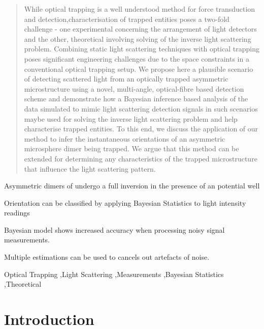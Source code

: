 \documentclass[preprint,3p]{elsarticle}
\begin{document}
\begin{frontmatter}
\begin{abstract}
While optical trapping is a well understood method for force transduction and detection,characterisation of trapped entities poses a two-fold challenge - one experimental concerning the arrangement of light detectors and the other, theoretical involving solving of the inverse light scattering problem. Combining static light scattering techniques with optical trapping poses significant engineering challenges due to the space constraints in a conventional optical trapping setup. We propose here a plausible scenario of detecting scattered light from an optically trapped asymmetric microstructure using a novel, multi-angle, optical-fibre based detection scheme and demonstrate how a Bayesian inference based analysis of the data simulated to mimic light scattering detection signals in such scenarios maybe used for solving the inverse light scattering problem and help characterise trapped entities. To this end, we discuss the application of our method to infer the instantaneous orientations of an asymmetric microsphere dimer being trapped. We argue that this method can be extended for determining any characteristics of the trapped microstructure that influence the light scattering pattern.
\end{abstract}
\begin{highlights}
\item Asymmetric dimers of undergo a full inversion in the presence of an potential well
\item Orientation can be classified by applying Bayesian Statistics to light intensity readings
\item Bayesian model shows increased accuracy when processing noisy signal measurements. 
\item Multiple estimations can be  used to cancels out artefacts of noise. 
\end{highlights}

\begin{keyword}
	Optical Trapping \sep Light Scattering \sep Measurements \sep Bayesian Statistics \sep Theoretical 
\end{keyword}

\end{frontmatter}

\linenumbers

\section{Introduction}
\label{sec:Intro}
\end{document}

